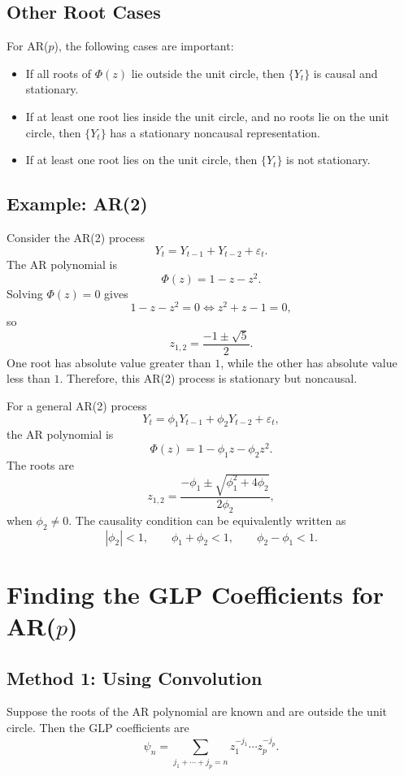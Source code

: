 \documentclass[12pt,oneside]{book}
\numberwithin{equation}{section}
\theoremstyle{definition}
\theoremstyle{plain}
\theoremstyle{remark}
\begin{document}
\subsection*{Other Root Cases}

For AR($p$), the following cases are important:

\begin{itemize}
\item If all roots of $\Phi(z)$ lie outside the unit circle, then $\{Y_t\}$ is causal and stationary.
\item If at least one root lies inside the unit circle, and no roots lie on the unit circle, then $\{Y_t\}$ has a stationary noncausal representation.
\item If at least one root lies on the unit circle, then $\{Y_t\}$ is not stationary.
\end{itemize}

\subsection{Example: AR(2)}

Consider the AR(2) process
\[
Y_t=Y_{t-1}+Y_{t-2}+\varepsilon_t.
\]
The AR polynomial is
\[
\Phi(z)=1-z-z^2.
\]
Solving $\Phi(z)=0$ gives
\[
1-z-z^2=0
\iff
z^2+z-1=0,
\]
so
\[
z_{1,2}
=
\frac{-1\pm \sqrt{5}}{2}.
\]
One root has absolute value greater than $1$, while the other has absolute value less than $1$. Therefore, this AR(2) process is stationary but noncausal.

For a general AR(2) process
\[
Y_t=\phi_1Y_{t-1}+\phi_2Y_{t-2}+\varepsilon_t,
\]
the AR polynomial is
\[
\Phi(z)=1-\phi_1z-\phi_2z^2.
\]
The roots are
\[
z_{1,2}
=
\frac{-\phi_1\pm \sqrt{\phi_1^2+4\phi_2}}{2\phi_2},
\]
when $\phi_2\neq 0$. The causality condition can be equivalently written as
\[
|\phi_2|<1,
\qquad
\phi_1+\phi_2<1,
\qquad
\phi_2-\phi_1<1.
\]

\section{Finding the GLP Coefficients for AR($p$)}

\subsection{Method 1: Using Convolution}

Suppose the roots of the AR polynomial are known and are outside the unit circle. Then the GLP coefficients are
\[
\psi_n
=
\sum_{j_1+\cdots+j_p=n}
z_1^{-j_1}\cdots z_p^{-j_p}.
\]
\end{document}
